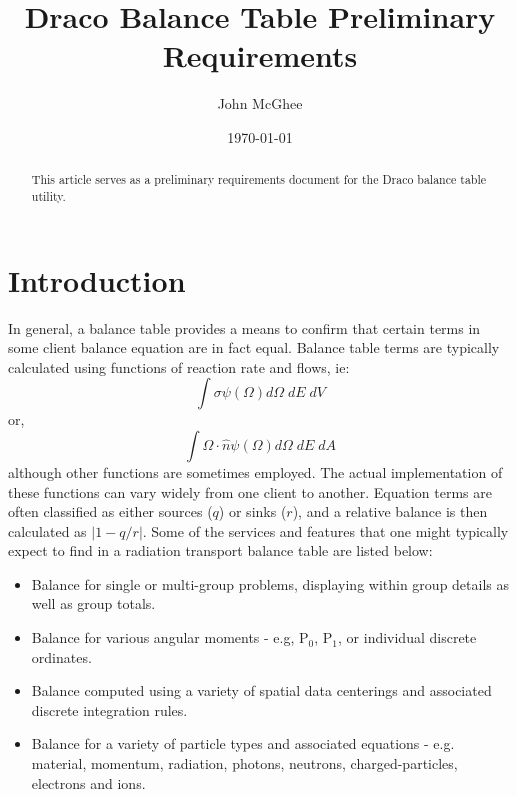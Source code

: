 \documentclass[reqno]{lanl}
\begin{document}

\title{Draco Balance Table Preliminary Requirements}
\author{John McGhee}
\address{X--TM, MS D409, Los Alamos National Laboratory, Los Alamos, NM
  87544}

\date{\today}

\begin{abstract}
This article serves as a preliminary requirements
document for the Draco balance table utility.
\end{abstract}

\maketitle


\section*{Introduction}
In general, a balance table
provides a means to confirm that certain terms in some client
balance equation are in fact equal. 
Balance table terms are typically  calculated
      using functions of reaction rate and flows, ie:
      \begin{equation}
       \int \sigma \psi(\Omega) d\Omega \; dE \; dV
      \end{equation}
or,
      \begin{equation}
      \int \Omega \cdot \hat{n} \psi(\Omega) d\Omega \; dE \; dA
      \end{equation}
although other functions are sometimes employed.
      The actual implementation of these
      functions can vary widely from one client to another.
Equation terms are often classified as either
sources ($q$) or sinks ($r$), and a relative
balance is then calculated as $\left| 1-q/r \right|$.
Some of the services and features that
one might typically expect to find in a radiation 
transport balance table are listed
below:

\begin{itemize}
\item Balance for single or multi-group problems, displaying 
       within group details as well as  group totals.
\item Balance for various angular moments - e.g, P$_0$, P$_1$, or
      individual discrete ordinates.
\item Balance computed using a variety of spatial data
      centerings and associated discrete integration rules.
\item Balance for a variety of particle types and associated equations - 
       e.g. material, momentum, radiation, photons, neutrons, 
      charged-particles, electrons and ions.
\end{itemize}
\end{document}
